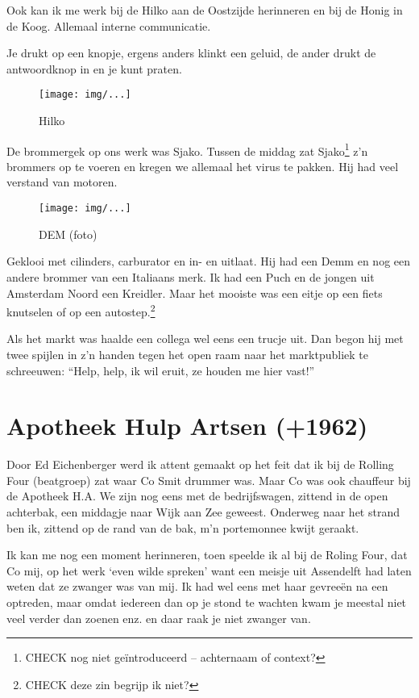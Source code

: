 \documentclass[10pt,twoside,openright]{memoir}
\begin{document}
Ook kan ik me werk bij de Hilko aan de Oostzijde herinneren en bij de Honig in de Koog. Allemaal interne communicatie. 

Je drukt op een knopje, ergens anders klinkt een geluid, de ander drukt de antwoordknop in en je kunt praten.	

\begin{figure}[t]
\texttt{[image: img/...]}
\caption{Hilko}
\end{figure}

De brommergek op ons werk was Sjako. Tussen de middag zat Sjako\footnote{CHECK nog niet geïntroduceerd -- achternaam of context?} z'n brommers op te voeren en kregen we allemaal het virus te pakken. Hij had veel verstand van motoren. 

\begin{figure}[t]
\texttt{[image: img/...]}
\caption{DEM (foto)}
\end{figure}

Geklooi met cilinders, carburator en in- en uitlaat. Hij had een Demm en nog een andere brommer van een Italiaans merk. Ik had een Puch en de jongen uit Amsterdam Noord een Kreidler. Maar het mooiste was een eitje op een fiets knutselen of op een autostep.\footnote{CHECK deze zin begrijp ik niet?}

Als het markt was haalde een collega wel eens een trucje uit.  Dan begon hij met twee spijlen in z'n handen tegen het open raam naar het marktpubliek te schreeuwen: ``Help, help, ik wil eruit, ze houden me hier vast!”

\chapter{Apotheek Hulp Artsen (+1962)} %
\label{cha:apotheek}

Door Ed Eichenberger werd ik attent gemaakt op het feit dat ik bij de Rolling Four (beatgroep) zat waar Co Smit drummer was. Maar Co was ook chauffeur bij de Apotheek H.A. We zijn nog eens met de bedrijfswagen, zittend in de open achterbak, een middagje naar Wijk aan Zee geweest. Onderweg naar het strand ben ik, zittend op de rand van de bak, m’n portemonnee kwijt geraakt.

Ik kan me nog een moment herinneren, toen speelde ik al bij de Roling Four, dat Co mij, op het werk `even wilde spreken' want een meisje uit Assendelft had laten weten dat ze zwanger was van mij. Ik had wel eens met haar gevreeën na een optreden, maar omdat iedereen dan op je stond te wachten kwam je meestal niet veel verder dan zoenen enz. en daar raak je niet zwanger van. 
\end{document}
